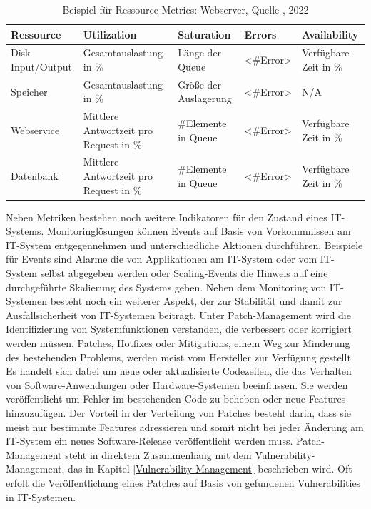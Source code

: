 \begin{table}[H]
    \centering
    \caption{Beispiel für Ressource-Metrics: Webserver, Quelle \autocite{le-quoc_2015}, 2022} 
    \tiny
        \begin{tabular}{lllll}
            \hline
            Ressource & Utilization & Saturation & Errors & Availability\\
            \hline\hline
            Disk Input/Output & Gesamtauslastung in \% & Länge der Queue & <\#Error> & Verfügbare Zeit in \% \\
            Speicher & Gesamtauslastung in \% & Größe der Auslagerung & <\#Error> & N/A \\
            Webservice & Mittlere Antwortzeit pro Request in \% & \#Elemente in Queue & <\#Error> & Verfügbare Zeit in \% \\
            Datenbank & Mittlere Antwortzeit pro Request in \% & \#Elemente in Queue & <\#Error> & Verfügbare Zeit in \% \\
        \end{tabular}
        \label{table:RM-Beispiele}
\end{table}
\bigbreak
Neben Metriken bestehen noch weitere Indikatoren für den Zustand eines IT-Systems. Monitoringlösungen können \glqq{}Events\grqq{} auf Basis von Vorkommnissen am IT-System entgegennehmen und unterschiedliche Aktionen durchführen. Beispiele für Events sind \glqq{}Alarme\grqq{} die von Applikationen am IT-System oder vom IT-System selbst abgegeben werden oder \glqq{}Scaling-Events\grqq{} die Hinweis auf eine durchgeführte Skalierung des Systems geben. 
\bigbreak
Neben dem Monitoring von IT-Systemen besteht noch ein weiterer Aspekt, der zur Stabilität und damit zur Ausfallsicherheit von IT-Systemen beiträgt. Unter \glqq{}Patch-Management\grqq{} wird die Identifizierung von Systemfunktionen verstanden, die verbessert oder korrigiert werden müssen. Patches, Hotfixes oder Mitigations, einem Weg zur Minderung des bestehenden Problems, werden meist vom Hersteller zur Verfügung gestellt. Es handelt sich dabei um neue oder aktualisierte Codezeilen, die das Verhalten von Software-Anwendungen oder Hardware-Systemen beeinflussen. Sie werden veröffentlicht um Fehler im bestehenden Code zu beheben oder neue Features hinzuzufügen. Der Vorteil in der Verteilung von Patches besteht darin, dass sie meist nur bestimmte Features adressieren und somit nicht bei jeder Änderung am IT-System ein neues Software-Release veröffentlicht werden muss. Patch-Management steht in direktem Zusammenhang mit dem \glqq{}Vulnerability-Management\grqq{}, das in Kapitel \ref{Vulnerability-Management} beschrieben wird. Oft erfolt die Veröffentlichung eines Patches auf Basis von gefundenen Vulnerabilities in IT-Systemen. \autocite{redhat}
